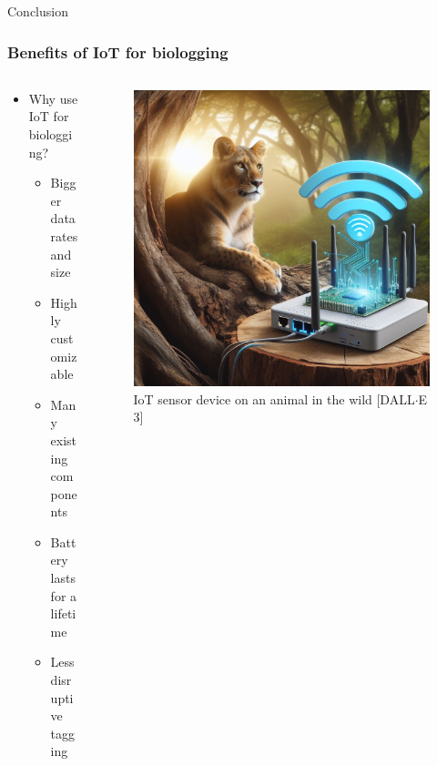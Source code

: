 \documentclass{beamer}
\begin{document}
\begin{frame}{Conclusion}
  \frametitle{Benefits of IoT for biologging}
  \begin{columns}
    \begin{column}{0.5\textwidth}
      \begin{itemize}
        \item Why use IoT for biologging?
        \begin{itemize}
          \item Bigger data rates and size
          \item Highly customizable
          \item Many existing components
          \item Battery lasts for a lifetime
          \item Less disruptive tagging
        \end{itemize}
      \end{itemize}
    \end{column}
    \begin{column}{0.5\textwidth}
      \begin{figure}[htbp]
        \centering
        \includegraphics[width=.9\textwidth]{IoT_Lion.jpg}
        \caption{IoT sensor device on an animal in the wild [DALL$\cdot$E 3]}
        \label{fig:IoT_Lion}
      \end{figure}
    \end{column}
  \end{columns}
\end{frame}
\end{document}
